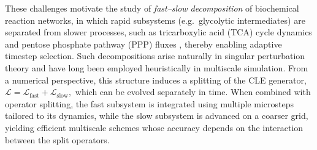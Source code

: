 \documentclass{article}
\begin{document}


These challenges motivate the study of \emph{fast--slow decomposition} of biochemical reaction networks, in which rapid subsystems (e.g.\ glycolytic intermediates) are separated from slower processes, such as tricarboxylic acid (TCA) cycle dynamics \cite{wang2024multi} and pentose phosphate pathway (PPP) fluxes \cite{templeton2013peak,wang2024metabolic}, thereby enabling adaptive timestep selection.
Such decompositions arise naturally in singular perturbation theory \cite{pavliotis2008multiscale,berglund2006noise} and have long been employed heuristically in multiscale simulation. 
From a numerical perspective, this structure induces a splitting of the CLE generator,
\(
\mathcal{L} = \mathcal{L}_{\mathrm{fast}} + \mathcal{L}_{\mathrm{slow}},
\)
which can be evolved separately in time. When combined with operator splitting, the fast subsystem is integrated using multiple microsteps tailored to its dynamics, while the slow subsystem is advanced on a coarser grid, yielding efficient multiscale schemes whose accuracy depends on the interaction between the split operators.
\end{document}
